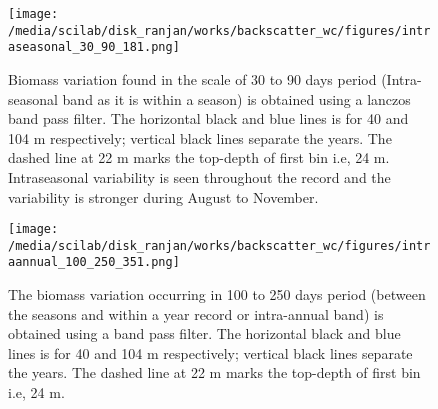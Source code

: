 \documentclass{article}
\begin{document}
\begin{figure}[htbp]
	\centering
	\texttt{[image: /media/scilab/disk\_ranjan/works/backscatter\_wc/figures/intraseasonal\_30\_90\_181.png]} 
	\captionsetup{justification=justified,font=footnotesize,skip=0.05\baselineskip,width=\textwidth}
	\caption{Biomass variation found in the scale of 30 to 90 days  period (Intra-seasonal band as it is within a season) is obtained using a lanczos band pass filter. The horizontal black and blue lines is for 40 and 104 m respectively; vertical black lines separate the years. The dashed line at 22 m marks the top-depth of first bin i.e, 24 m.  Intraseasonal variability is seen throughout the record and the variability is stronger during August to November.}
	\label{fig:fig11}
\end{figure}

\begin{figure}[htbp]
	\centering
	\texttt{[image: /media/scilab/disk\_ranjan/works/backscatter\_wc/figures/intraannual\_100\_250\_351.png]} 
	\captionsetup{justification=justified,font=footnotesize,skip=0.05\baselineskip,width=\textwidth}
	\caption{The biomass variation occurring in 100 to 250 days period (between the seasons and within a year record or intra-annual band) is obtained using a band pass filter. The horizontal black and blue lines is for 40 and 104 m respectively; vertical black lines separate the years. The dashed line at 22 m marks the top-depth of first bin i.e, 24 m. }
	\label{fig:fig12}
\end{figure}
\end{document}
